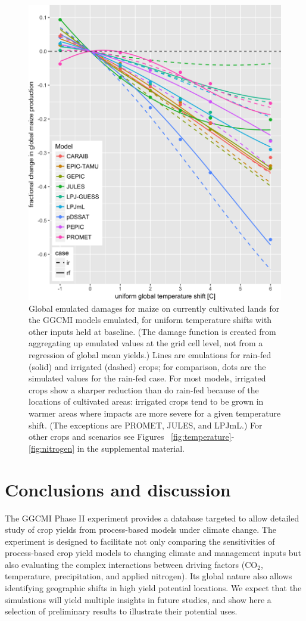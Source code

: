 \documentclass[preprint, 5p, times, twocolumn]{elsarticle}
\begin{document}
\begin{figure}[!htb]
    \centering
    \includegraphics[width=0.95\linewidth]{figures/global_em_maize.png}
    \caption{Global emulated damages for maize on currently cultivated lands for the GGCMI models emulated, for uniform temperature shifts with other inputs held at baseline. (The damage function is created from aggregating up emulated values at the grid cell level, not from a regression of global mean yields.) Lines are emulations for rain-fed (solid) and irrigated (dashed) crops; for comparison, dots are the simulated values for the rain-fed case.  For most models, irrigated crops show a sharper reduction than do rain-fed because of the locations of cultivated areas: irrigated crops tend to be grown in warmer areas where impacts are more severe for a given temperature shift. (The exceptions are PROMET, JULES, and LPJmL.) For other crops and scenarios see Figures ~\ref{fig:temperature}- \ref{fig:nitrogen} in the supplemental material.}
    \label{fig:globe_em}
\end{figure}

\section{Conclusions and discussion} 
\label{S:4}
The GGCMI Phase II experiment provides a database targeted to allow detailed study of crop yields from process-based models under climate change. The experiment is designed to facilitate not only comparing the sensitivities of process-based crop yield models to changing climate and management inputs but also evaluating the complex interactions between driving factors (CO$_2$, temperature, precipitation, and applied nitrogen). Its global nature also allows identifying geographic shifts in high yield potential locations.  We expect that the simulations will yield multiple insights in future studies, and show here a selection of preliminary results to illustrate their potential uses. 
\end{document}
